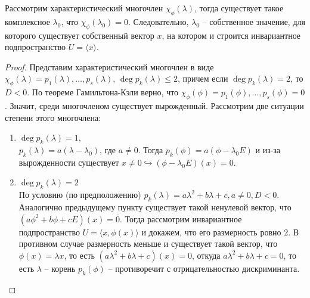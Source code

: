 \begin{proposition}
    Рассмотрим характеристический многочлен $\chi_{\phi}(\lambda)$, тогда существует такое комплексное $\lambda_0$, что $\chi_{\phi}(\lambda_0) = 0$. Следовательно, $\lambda_0$ -- собственное значение, для которого существует собственный вектор $x$, на котором и строится инвариантное подпространство $U = \langle x \rangle$.
\end{proposition}

\begin{proof}
    Представим характеристический многочлен в виде $\chi_{\phi}(\lambda) = p_1(\lambda), \dots, p_s(\lambda)$, $\deg p_k(\lambda) \leq 2$, причем если $\deg p_k(\lambda) = 2$, то $D < 0$. По теореме Гамильтона-Кэли верно, что $\chi_{\phi}(\phi) = p_1(\phi), \dots, p_s(\phi) = 0$. Значит, среди многочленом существует вырожденный. Рассмотрим две ситуации степени этого многочлена:
    \begin{enumerate}
        \item $\deg p_k(\lambda) = 1$, \\
        $p_k(\lambda) = a(\lambda - \lambda_0)$, где $a \neq 0$. Тогда $p_k(\phi) = a(\phi - \lambda_0 E)$ и из-за вырожденности существует $x \neq 0 \hookrightarrow (\phi - \lambda_0 E)(x) = 0$.
        \item $\deg p_k(\lambda) = 2$ \\
        По условию (по предположению) $p_k(\lambda) = a \lambda^2 + b \lambda + c, a \neq 0, D < 0$. Аналогично предыдущему пункту существует такой ненулевой вектор, что $(a\phi^2 + b\phi +cE)(x) = \overline{0}$. Тогда рассмотрим инвариантное подпространство $U = \langle x, \phi(x) \rangle$ и докажем, что его размерность ровно $2$. В противном случае размерность меньше и существует такой вектор, что $\phi(x) = \lambda x$, то есть $(a \lambda^2 + b \lambda + c)(x) = 0$, откуда $a \lambda^2 + b \lambda + c = 0$, то есть $\lambda$ -- корень $p_k(\phi)$ -- противоречит с отрицательностью дискриминанта.
    \end{enumerate}
\end{proof}